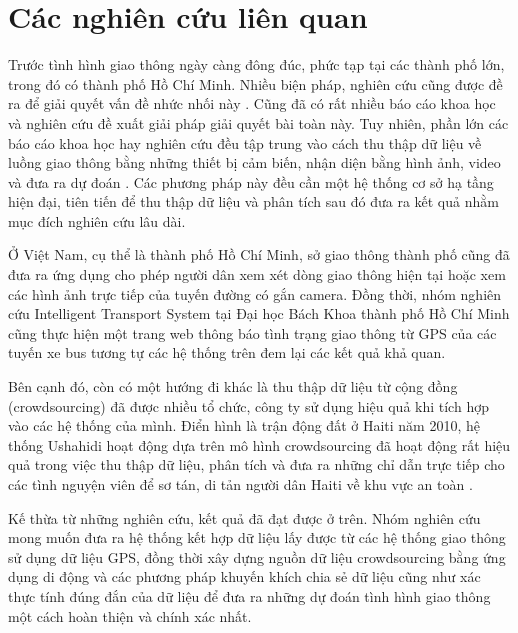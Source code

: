 
\chapter{Các nghiên cứu liên quan} %

\label{Chapter2} %

Trước tình hình giao thông ngày càng đông đúc, phức tạp tại các thành phố lớn, trong đó có thành phố Hồ Chí Minh. Nhiều biện pháp, nghiên cứu cũng được đề ra để giải quyết vấn đề nhức nhối này \cite{FSPPM}. Cũng đã có rất nhiều báo cáo khoa học và nghiên cứu đề xuất giải pháp giải quyết bài toàn này. Tuy nhiên, phần lớn các báo cáo khoa học hay nghiên cứu đều tập trung vào cách thu thập dữ liệu về luồng giao thông bằng những thiết bị cảm biến, nhận diện bằng hình ảnh, video và đưa ra dự đoán \cite{VEGV} \cite{RTD}. Các phương pháp này đều cần một hệ thống cơ sở hạ tầng hiện đại, tiên tiến để thu thập dữ liệu và phân tích sau đó đưa ra kết quả nhằm mục đích nghiên cứu lâu dài.

Ở Việt Nam, cụ thể là thành phố Hồ Chí Minh, sở giao thông thành phố cũng đã đưa ra ứng dụng \cite{VOVAPP} cho phép người dân xem xét dòng giao thông hiện tại hoặc xem các hình ảnh trực tiếp của tuyến đường có gắn camera. Đồng thời, nhóm nghiên cứu Intelligent Transport System tại Đại học Bách Khoa thành phố Hồ Chí Minh cũng thực hiện một trang web \cite{HCMUT} thông báo tình trạng giao thông từ GPS của các tuyến xe bus tương tự các hệ thống trên đem lại các kết quả khả quan.

Bên cạnh đó, còn có một hướng đi khác là thu thập dữ liệu từ cộng đồng (crowdsourcing) đã được nhiều tổ chức, công ty \cite{16} sử dụng hiệu quả khi tích hợp vào các hệ thống của mình. Điển hình là trận động đất ở Haiti năm 2010, hệ thống Ushahidi hoạt động dựa trên mô hình crowdsourcing đã hoạt động rất hiệu quả trong việc thu thập dữ liệu, phân tích và đưa ra những chỉ dẫn trực tiếp cho các tình nguyện viên để sơ tán, di tản người dân Haiti về khu vực an toàn \cite{23} \cite{24}.

Kế thừa từ những nghiên cứu, kết quả đã đạt được ở trên. Nhóm nghiên cứu mong muốn đưa ra hệ thống kết hợp dữ liệu lấy được từ các hệ thống giao thông sử dụng dữ liệu GPS, đồng thời xây dựng nguồn dữ liệu crowdsourcing bằng ứng dụng di động và các phương pháp khuyến khích chia sẻ dữ liệu cũng như xác thực tính đúng đắn của dữ liệu để đưa ra những dự đoán tình hình giao thông một cách hoàn thiện và chính xác nhất. 